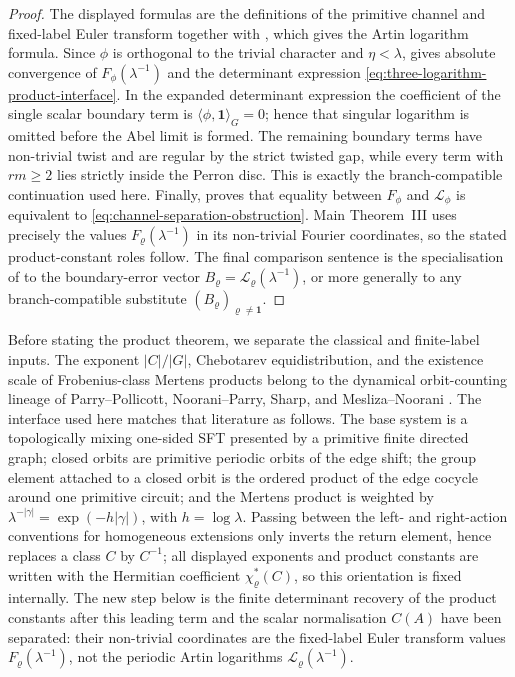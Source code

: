 \documentclass[11pt,a4paper]{amsart}
\theoremstyle{plain}
\theoremstyle{definition}
\theoremstyle{remark}
\begin{document}
\begin{proof}
  The displayed formulas are the definitions of the primitive channel and
  fixed-label Euler transform together with
  , which gives the Artin
  logarithm formula.  Since \(\phi\) is orthogonal to the trivial character
  and \(\eta<\lambda\),  gives
  absolute convergence of \(F_\phi(\lambda^{-1})\) and the determinant
  expression \eqref{eq:three-logarithm-product-interface}.  In the expanded
  determinant expression the coefficient of the single scalar boundary term is
  \(\langle\phi,\mathbf1\rangle_G=0\); hence that singular logarithm is omitted
  before the Abel limit is formed.  The remaining boundary terms have
  non-trivial twist and are regular by the strict twisted gap, while every
  term with \(rm\ge2\) lies strictly inside the Perron disc.  This is exactly
  the branch-compatible continuation used here.
  Finally,  proves that equality
  between \(F_\phi\) and \(\mathcal L_\phi\) is equivalent to
  \eqref{eq:channel-separation-obstruction}.  Main Theorem~III uses
  precisely the values \(F_\varrho(\lambda^{-1})\) in its non-trivial
  Fourier coordinates, so the stated product-constant roles follow.  The
  final comparison sentence is the specialisation of
   to the boundary-error
  vector
  \(B_\varrho=\mathcal L_\varrho(\lambda^{-1})\), or more generally to any
  branch-compatible substitute \((B_\varrho)_{\varrho\ne\mathbf1}\).
\end{proof}

Before stating the product theorem, we separate the classical and finite-label
inputs.  The exponent \(|C|/|G|\), Chebotarev equidistribution, and the
existence scale of Frobenius-class Mertens products belong to the dynamical
orbit-counting lineage of Parry--Pollicott, Noorani--Parry, Sharp, and
Mesliza--Noorani
\cite{ParryPollicott1986Chebotarev,NooraniParry1992ChebotarevShifts,Sharp1991Mertens,MeslizaNoorani1999FrobeniusMertens}.
The interface used here matches that literature as follows.  The base system is
a topologically mixing one-sided SFT presented by a primitive finite directed
graph; closed orbits are primitive periodic orbits of the edge shift; the
group element attached to a closed orbit is the ordered product of the edge
cocycle around one primitive circuit; and the Mertens product is weighted by
\(\lambda^{-|\gamma|}=\exp(-h|\gamma|)\), with \(h=\log\lambda\).  Passing
between the left- and right-action conventions for homogeneous extensions
only inverts the return element, hence replaces a class \(C\) by \(C^{-1}\);
all displayed exponents and product constants are written with the Hermitian
coefficient \(\chi_\varrho^\ast(C)\), so this orientation is fixed internally.
The new step below is the finite determinant recovery of the product constants
after this leading term and the scalar normalisation \(C(A)\) have been
separated: their non-trivial coordinates are the fixed-label Euler transform
values \(F_\varrho(\lambda^{-1})\), not the periodic Artin logarithms
\(\mathcal L_\varrho(\lambda^{-1})\).
\end{document}
